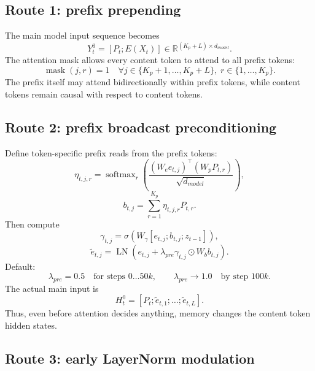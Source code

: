 \documentclass[11pt]{article}
\newcommand{\R}{\mathbb{R}}
\newcommand{\softmax}{\operatorname{softmax}}
\newcommand{\LN}{\operatorname{LN}}
\begin{document}
\subsection{Route 1: prefix prepending}

The main model input sequence becomes
\begin{equation}
    Y_t^0=[P_t;E(X_t)]\in\R^{(K_p+L)\times d_{model}}.
\end{equation}
The attention mask allows every content token to attend to all prefix tokens:
\begin{equation}
    \operatorname{mask}(j,r)=1 \quad \forall j\in\{K_p+1,\ldots,K_p+L\},\; r\in\{1,\ldots,K_p\}.
\end{equation}
The prefix itself may attend bidirectionally within prefix tokens, while content tokens remain causal with respect to content tokens.

\subsection{Route 2: prefix broadcast preconditioning}

Define token-specific prefix reads from the prefix tokens:
\begin{equation}
    \eta_{t,j,r}=\softmax_r\left(\frac{(W_e e_{t,j})^\top (W_p P_{t,r})}{\sqrt{d_{model}}}\right),
\end{equation}
\begin{equation}
    b_{t,j}=\sum_{r=1}^{K_p}\eta_{t,j,r}P_{t,r}.
\end{equation}
Then compute
\begin{equation}
    \gamma_{t,j}=\sigma\left(W_\gamma[e_{t,j};b_{t,j};z_{t-1}]\right),
\end{equation}
\begin{equation}
    \tilde{e}_{t,j}=\LN\left(e_{t,j}+\lambda_{pre}\gamma_{t,j}\odot W_b b_{t,j}\right).
\end{equation}
Default:
\begin{equation}
    \lambda_{pre}=0.5\quad\text{for steps }0\ldots 50k,
    \qquad \lambda_{pre}\rightarrow 1.0\quad\text{by step }100k.
\end{equation}
The actual main input is
\begin{equation}
    H_t^0 = [P_t;\tilde{e}_{t,1};\ldots;\tilde{e}_{t,L}].
\end{equation}
Thus, even before attention decides anything, memory changes the content token hidden states.

\subsection{Route 3: early LayerNorm modulation}
\end{document}
